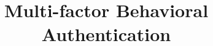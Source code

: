 \documentclass[conference,a4paper,english]{IEEEtran}
\begin{document}
\title{Multi-factor Behavioral Authentication}



\maketitle











\printbibliography{}
\end{document}
